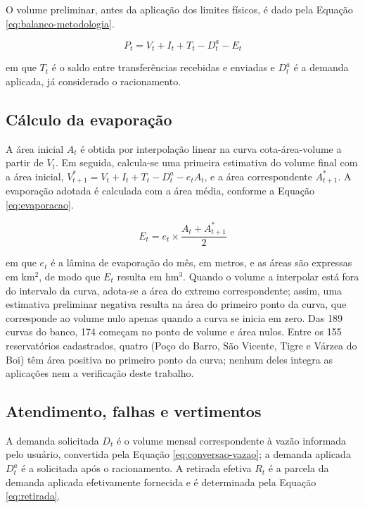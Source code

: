 O volume preliminar, antes da aplicação dos limites físicos, é dado pela Equação \ref{eq:balanco-metodologia}.

\begin{equation}
    P_t = V_t + I_t + T_t - D^{a}_t - E_t
    \label{eq:balanco-metodologia}
\end{equation}

em que $T_t$ é o saldo entre transferências recebidas e enviadas e $D^{a}_t$ é a demanda aplicada, já considerado o racionamento.

\subsection{Cálculo da evaporação}
\label{subsec:evaporacao}

A área inicial $A_t$ é obtida por interpolação linear na curva cota-área-volume a partir de $V_t$. Em seguida, calcula-se uma primeira estimativa do volume final com a área inicial, $V^{*}_{t+1} = V_t + I_t + T_t - D^{a}_t - e_t A_t$, e a área correspondente $A^{*}_{t+1}$. A evaporação adotada é calculada com a área média, conforme a Equação \ref{eq:evaporacao}.

\begin{equation}
    E_t = e_t \times \frac{A_t + A^{*}_{t+1}}{2}
    \label{eq:evaporacao}
\end{equation}

em que $e_t$ é a lâmina de evaporação do mês, em metros, e as áreas são expressas em km$^2$, de modo que $E_t$ resulta em hm$^3$. Quando o volume a interpolar está fora do intervalo da curva, adota-se a área do extremo correspondente; assim, uma estimativa preliminar negativa resulta na área do primeiro ponto da curva, que corresponde ao volume nulo apenas quando a curva se inicia em zero. Das 189 curvas do banco, 174 começam no ponto de volume e área nulos. Entre os 155 reservatórios cadastrados, quatro (Poço do Barro, São Vicente, Tigre e Várzea do Boi) têm área positiva no primeiro ponto da curva; nenhum deles integra as aplicações nem a verificação deste trabalho.

\subsection{Atendimento, falhas e vertimentos}
\label{subsec:atendimento-falhas}

A demanda solicitada $D_t$ é o volume mensal correspondente à vazão informada pelo usuário, convertida pela Equação \ref{eq:conversao-vazao}; a demanda aplicada $D^{a}_t$ é a solicitada após o racionamento. A retirada efetiva $R_t$ é a parcela da demanda aplicada efetivamente fornecida e é determinada pela Equação \ref{eq:retirada}.


